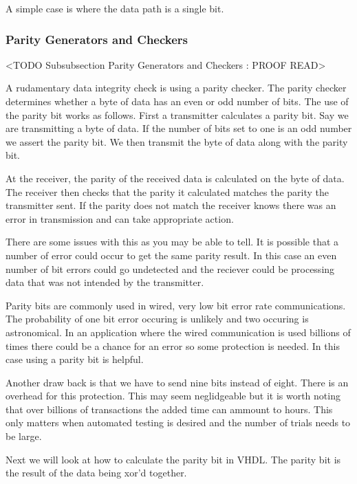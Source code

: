 A simple case is where the data path is a single bit. 

\subsubsection{Parity Generators and Checkers}
	<TODO Subsubsection  Parity Generators and Checkers : PROOF READ>
	
A rudamentary data integrity check is using a parity checker. The parity checker determines whether a byte of data has an even or odd number of bits. The use of the parity bit works as follows. First a transmitter calculates a parity bit. Say we are transmitting a byte of data. If the number of bits set to one is an odd number we assert the parity bit. We then transmit the byte of data along with the parity bit. 

At the receiver, the parity of the received data is calculated on the byte of data. The receiver then checks that the parity it calculated matches the parity the transmitter sent. If the parity does not match the receiver knows there was an error in transmission and can take appropriate action.

There are some issues with this as you may be able to tell. It is possible that a number of error could occur to get the same parity result. In this case an even number of bit errors could go undetected and the reciever could be processing data that was not intended by the transmitter. 

Parity bits are commonly used in wired, very low bit error rate communications. The probability of one bit error occuring is unlikely and two occuring is astronomical. In an application where the wired communication is used billions of times there could be a chance for an error so some protection is needed. In this case using a parity bit is helpful. 

Another draw back is that we have to send nine bits instead of eight. There is an overhead for this protection. This may seem neglidgeable but it is worth noting that over billions of transactions the added time can ammount to hours. This only matters when automated testing is desired and the number of trials needs to be large. 

Next we will look at how to calculate the parity bit in \ac{VHDL}. The parity bit is the result of the data being \ac{xor}'d together.

